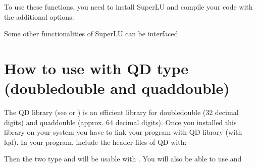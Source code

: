 \documentclass[a4paper,11pt,english]{sphinxmanual}
\begin{document}
\sphinxAtStartPar
To use these functions, you need to install SuperLU and compile your code with the additional options:

\begin{sphinxVerbatim}[commandchars=\\\{\}]
      
\end{sphinxVerbatim}

\sphinxAtStartPar
Some other functionalities of SuperLU can be interfaced.


\chapter{How to use  with QD type (double\sphinxhyphen{}double and quad\sphinxhyphen{}double)}
\label{\detokenize{gmm/qd:how-to-use-gmm-with-qd-type-double-double-and-quad-double}}\label{\detokenize{gmm/qd:gmm-qd}}\label{\detokenize{gmm/qd::doc}}
\sphinxAtStartPar
The QD library (see  or ) is an efficient library for double\sphinxhyphen{}double (32 decimal digits) and quad\sphinxhyphen{}double (approx. 64 decimal digits). Once you installed this library on your system you have to link your program with QD library (with \sphinxhyphen{}lqd). In your program, include the header files of QD with:

\begin{sphinxVerbatim}[commandchars=\\\{\}]
 
 
 
\end{sphinxVerbatim}

\sphinxAtStartPar
Then the two type  and  will be usable with . You will also be able to use  and 
\end{document}
